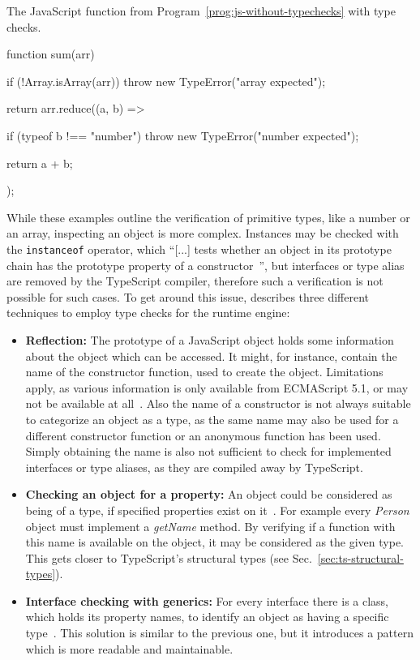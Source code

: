 \begin{program}
\caption{The JavaScript function from Program~\ref{prog:js-without-typechecks} with type checks.}
\label{prog:js-with-typechecks}
\begin{JsCode}
function sum(arr) {
  if (!Array.isArray(arr)) {
    throw new TypeError("array expected");
  }
  
  return arr.reduce((a, b) => {
    if (typeof b !== "number") {
      throw new TypeError("number expected");
    }
    
    return a + b;
  });
}
\end{JsCode}
\end{program}
While these examples outline the verification of primitive types, like a number or an array, inspecting an object is more complex. Instances may be checked with the \texttt{instanceof} operator, which ``[...] tests whether an object in its prototype chain has the prototype property of a constructor~\cite{instanceof:MDN:2017}'', but interfaces or type alias are removed by the TypeScript compiler, therefore such a verification is not possible for such cases. To get around this issue, \citeauthor{MasteringTypeScript:Rozentals:2015} describes three different techniques to employ type checks for the runtime engine:
\begin{itemize}
  \item \textbf{Reflection:} The prototype of a JavaScript object holds 
some information about the object which can be accessed. It might, for instance, contain the name of the constructor function, used to create the object. Limitations apply, as various
information is only available from ECMAScript 5.1, or may not be available at all~\cite[pp.~98--100]{MasteringTypeScript:Rozentals:2015}. Also the name of a constructor is not always suitable to categorize an object as a type, as the same name may also be used for a different constructor function or an anonymous function has been used. Simply obtaining the name is also not sufficient to check for implemented interfaces or type aliases, as they are compiled away by TypeScript.
  \item \textbf{Checking an object for a property:} An object could be considered 
as being of a type, if specified properties exist on it~\cites[pp.~101--102]{MasteringTypeScript:Rozentals:2015}[pp.~18--20]{ProJavaScriptDesignPatterns:HarmesDiaz:2008}. For example every \textit{Person} object must implement a \textit{getName} method. By verifying if a function with this name is available on the object, it may be considered as the given type. This gets closer to TypeScript's structural types (see Sec.~\ref{sec:ts-structural-types}).
  \item \textbf{Interface checking with generics:} For every interface there is a 
class, which holds its property names, to identify an object as 
having a specific type~\cites[pp.~102-105]{MasteringTypeScript:Rozentals:2015}[pp.~17--19]{ProJavaScriptDesignPatterns:HarmesDiaz:2008}. This solution is similar to the previous one, but it introduces a pattern which is more readable and maintainable.
\end{itemize}
